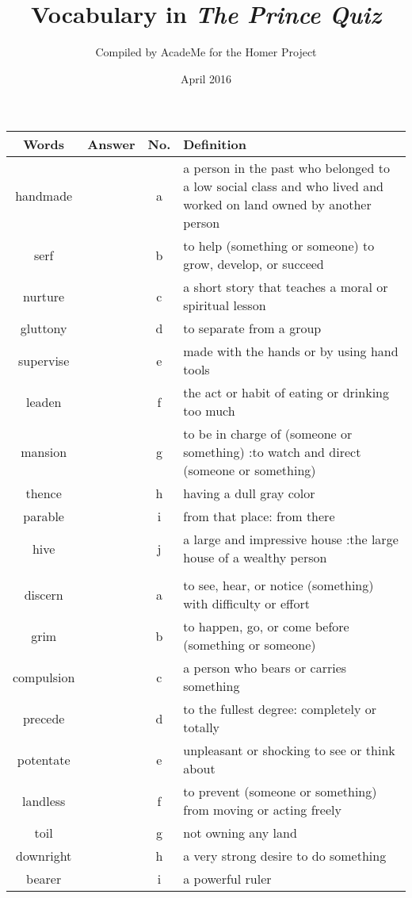 \documentclass[a4paper]{article}
\title{Vocabulary in \textit{The Prince Quiz}}
\author{Compiled by AcadeMe for the Homer Project}
\date{April 2016}
\begin{document}
\maketitle
\begin{center}
\begin{tabular}{|c|c|c|m{}|}
\hline
Words & Answer & No. & Definition \\
\hline
handmade & & a &  a person in the past who belonged to a low social class and who lived and worked on land owned by another person \\
\hline
serf & & b &  to help (something or someone) to grow, develop, or succeed \\
\hline
nurture & & c &  a short story that teaches a moral or spiritual lesson \\
\hline
gluttony & & d &  to separate from a group \\
\hline
supervise & & e &  made with the hands or by using hand tools \\
\hline
leaden & & f &  the act or habit of eating or drinking too much\\
\hline
mansion & & g &  to be in charge of (someone or something) :to watch and direct (someone or something) \\
\hline
thence & & h &  having a dull gray color \\
\hline
parable & & i &  from that place: from there \\
\hline
hive & & j &  a large and impressive house :the large house of a wealthy person \\
\hline
 & & & \\
\hline
discern & & a &  to see, hear, or notice (something) with difficulty or effort \\
\hline
grim & & b &  to happen, go, or come before (something or someone) \\
\hline
compulsion & & c &  a person who bears or carries something \\
\hline
precede & & d &  to the fullest degree: completely or totally \\
\hline
potentate & & e &  unpleasant or shocking to see or think about \\
\hline
landless & & f &  to prevent (someone or something) from moving or acting freely \\
\hline
toil & & g &  not owning any land \\
\hline
downright & & h &  a very strong desire to do something \\
\hline
bearer & & i &  a powerful ruler \\

\end{tabular}
\end{center}
\end{document}
